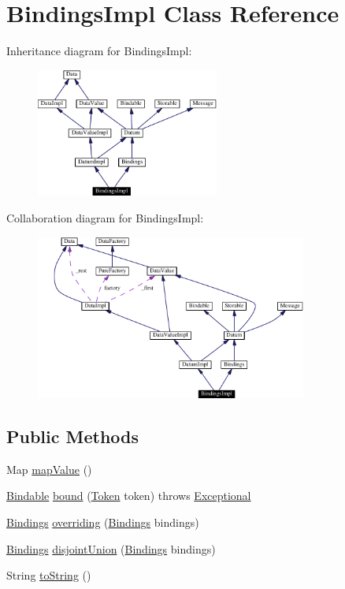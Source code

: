 \hypertarget{classBindingsImpl}{
\section{Bindings\-Impl  Class Reference}
\label{classBindingsImpl}
}
Inheritance diagram for Bindings\-Impl:\begin{figure}[H]
\begin{center}
\leavevmode
\includegraphics[width=170pt]{classBindingsImpl__inherit__graph}
\end{center}
\end{figure}
Collaboration diagram for Bindings\-Impl:\begin{figure}[H]
\begin{center}
\leavevmode
\includegraphics[width=253pt]{classBindingsImpl__coll__graph}
\end{center}
\end{figure}
\subsection*{Public Methods}
\begin{CompactItemize}
\item 
Map \hyperlink{classBindingsImpl_a0}{map\-Value} ()
\item 
\hyperlink{interfaceBindable}{Bindable} \hyperlink{classBindingsImpl_a1}{bound} (\hyperlink{interfaceToken}{Token} token) throws \hyperlink{classExceptional}{Exceptional}
\item 
\hyperlink{interfaceBindings}{Bindings} \hyperlink{classBindingsImpl_a2}{overriding} (\hyperlink{interfaceBindings}{Bindings} bindings)
\item 
\hyperlink{interfaceBindings}{Bindings} \hyperlink{classBindingsImpl_a3}{disjoint\-Union} (\hyperlink{interfaceBindings}{Bindings} bindings)
\item 
String \hyperlink{classBindingsImpl_a4}{to\-String} ()
\end{CompactItemize}


